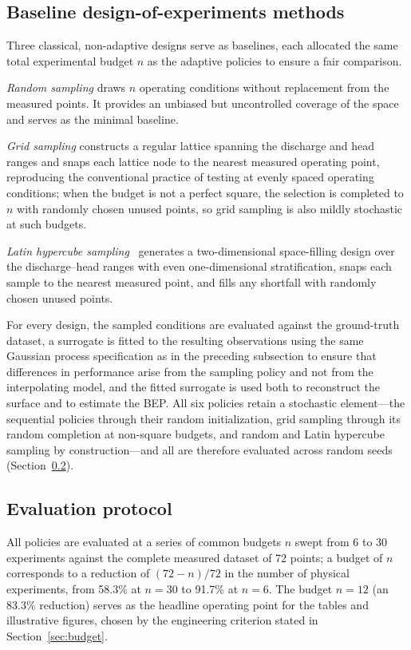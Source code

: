 \documentclass[preprint,12pt]{elsarticle}
\begin{document}
\subsection{Baseline design-of-experiments methods}
Three classical, non-adaptive designs serve as baselines, each allocated the same
total experimental budget $n$ as the adaptive policies to ensure a fair comparison.

\emph{Random sampling} draws $n$ operating conditions without replacement from the
measured points. It provides an unbiased but uncontrolled coverage of the space and
serves as the minimal baseline.

\emph{Grid sampling} constructs a regular lattice spanning the discharge and head
ranges and snaps each lattice node to the nearest measured operating point,
reproducing the conventional practice of testing at evenly spaced operating
conditions; when the budget is not a perfect square, the selection is completed to $n$
with randomly chosen unused points, so grid sampling is also mildly stochastic at such
budgets.

\emph{Latin hypercube sampling}~\cite{mckay1979lhs} generates a two-dimensional
space-filling design over the discharge--head ranges with even one-dimensional
stratification, snaps each sample to the nearest measured point, and fills any
shortfall with randomly chosen unused points.

For every design, the sampled conditions are evaluated against the ground-truth
dataset, a surrogate is fitted to the resulting observations using the same Gaussian
process specification as in the preceding subsection to ensure that differences in
performance arise from the sampling policy and not from the interpolating model, and
the fitted surrogate is used both to reconstruct the surface and to estimate the BEP.
All six policies retain a stochastic element---the sequential policies through their
random initialization, grid sampling through its random completion at non-square
budgets, and random and Latin hypercube sampling by construction---and all are
therefore evaluated across random seeds (Section~\ref{sec:eval}).

\subsection{Evaluation protocol}\label{sec:eval}
All policies are evaluated at a series of common budgets $n$ swept from 6 to 30
experiments against the complete measured dataset of 72 points; a budget of $n$
corresponds to a reduction of $(72 - n)/72$ in the number of physical experiments,
from 58.3\% at $n = 30$ to 91.7\% at $n = 6$. The budget $n = 12$ (an 83.3\%
reduction) serves as the headline operating point for the tables and illustrative
figures, chosen by the engineering criterion stated in Section~\ref{sec:budget}.
\end{document}

